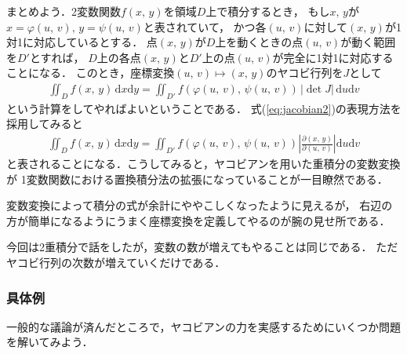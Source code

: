 まとめよう．2変数関数$f(x, \, y)$を領域$D$上で積分するとき，
もし$x, \, y$が$x=\varphi (u, \, v) , \, y = \psi (u, \, v)$と表されていて，
かつ各$(u, \, v)$に対して$(x, \, y)$が1対1に対応しているとする．
点$(x, \, y)$が$D$上を動くときの点$(u, \, v)$が動く範囲を$D'$とすれば，
$D$上の各点$(x, \, y)$と$D'$上の点$(u, \, v)$が完全に1対1に対応することになる．
このとき，座標変換$(u, \, v) \mapsto (x, \, y)$のヤコビ行列を$J$として
\begin{align}
\iint_D f(x, \, y) \, \mathrm{d}x \mathrm{d} y 
= \iint_{D'} f( \varphi (u, \, v) , \, \psi (u, \, v) ) \, \lvert \det J \rvert \, \mathrm{d}u \mathrm{d}v
\label{eq:jusekibunhenkan}
\end{align}
という計算をしてやればよいということである．
式(\ref{eq:jacobian2})の表現方法を採用してみると
\begin{align}
\iint_D f(x, \, y) \, \mathrm{d}x \mathrm{d} y 
= \iint_{D'} f( \varphi (u, \, v) , \, \psi (u, \, v) ) 
\left \lvert \frac{ \partial (x, \, y) } { \partial (u, \, v) } \right \rvert \mathrm{d}u \mathrm{d}v
\label{eq:jusekibunhenkan2}
\end{align}
と表されることになる．こうしてみると，ヤコビアンを用いた重積分の変数変換が
1変数関数における置換積分法の拡張になっていることが一目瞭然である．

変数変換によって積分の式が余計にややこしくなったように見えるが，
右辺の方が簡単になるようにうまく座標変換を定義してやるのが腕の見せ所である．

今回は2重積分で話をしたが，変数の数が増えてもやることは同じである．
ただヤコビ行列の次数が増えていくだけである．

\subsubsection{具体例}
一般的な議論が済んだところで，ヤコビアンの力を実感するためにいくつか問題を解いてみよう．

